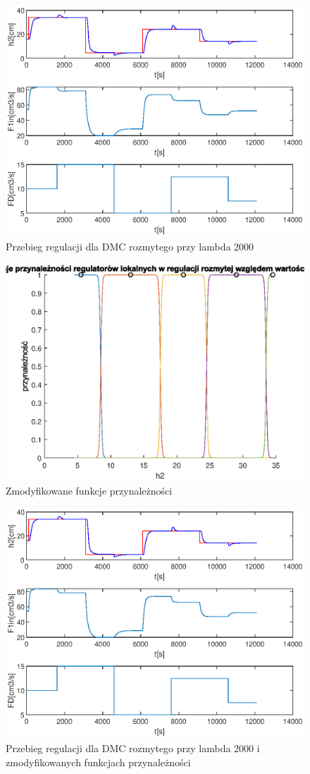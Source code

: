 		\begin{figure}[h!]
			\includegraphics[width=0.9\linewidth]{plots/z2_dmc2000oryg.eps}
			\caption{Przebieg regulacji dla DMC rozmytego przy lambda 2000}
			\label{rys:dmcoryg}
		\end{figure}
		\begin{figure}[h!]
			\includegraphics[width=0.8\linewidth]{plots/z2_dmcprzyn.eps}
			\caption{Zmodyfikowane funkcje przynależności}
			\label{rys:dmcprzyn}
		\end{figure}
		\begin{figure}[h!]
			\includegraphics[width=0.9\linewidth]{plots/z2_dmc2000.eps}
			\caption{Przebieg regulacji dla DMC rozmytego przy lambda 2000 i zmodyfikowanych funkcjach przynależności}
			\label{rys:dmcroz2000}
		\end{figure}

